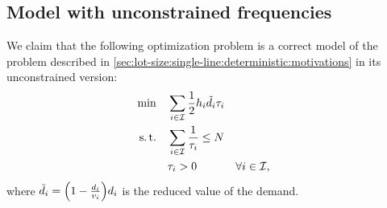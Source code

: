 





\subsection{Model with unconstrained frequencies}
\label{sec:lot-size:single-line:models:unconstraint}



We claim that the following optimization problem is a correct model of the problem described in \cref{sec:lot-size:single-line:deterministic:motivations} in its unconstrained version:
\begin{subequations}\label{eq:lot-size:single-line:deterministic:unconstraint}
  \begin{align}
  \min\quad & \displaystyle\sum_{i\in\mathcal{I}} \frac{1}{2}h_i\tilde{d}_i\tau_i
  \label{eq:lot-size:single-line:deterministic:unconstraint:objective}
  \\
  \operatorname{s.t.}\quad  & \displaystyle\sum_{i\in\mathcal{I}} \frac{1}{\tau_i} \le N
  \label{eq:lot-size:single-line:deterministic:unconstraint:flexibility}
  \\
       & \tau_i > 0 && \forall i\in\mathcal{I},
  \label{eq:lot-size:single-line:deterministic:unconstraint:positivity}
  \end{align}
\end{subequations}
where $\tilde{\demand}_i=\bracket{1-\frac{\demand_i}{\rate_i}}\demand_i$ is the reduced value of the demand.

